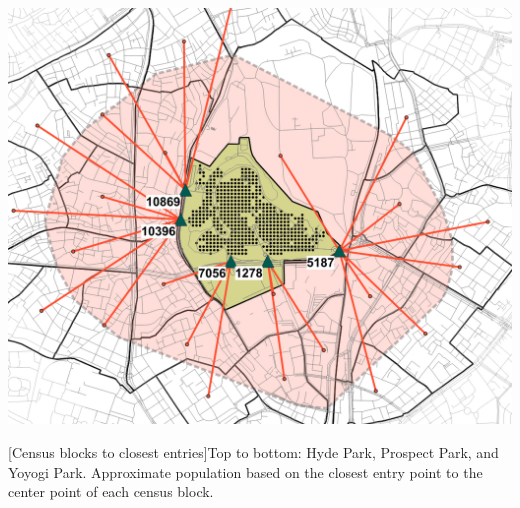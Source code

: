\begin{multicols}{2}
\begin{minipage}{0.45\textwidth}
    \includegraphics[width=\linewidth]{images/network/yoyogi_chome_nearest.png}\par\hspace{3pt}
    \par{}[Census blocks to closest entries]{Top to bottom: Hyde Park, Prospect Park, and Yoyogi Park. Approximate population based on the closest entry point to the center point of each census block.}
    \label{fig:nearest_entries}
\end{minipage}


\end{multicols}
